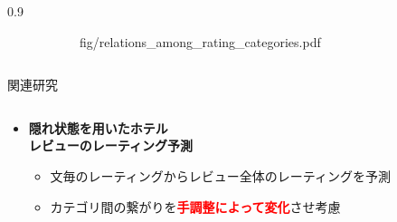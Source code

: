 \documentclass[unicode,10pt]{beamer}
\newlength{\mycolumnwidth}
\newcommand{\itemtitle}[1]{\textbf{#1}\\}
\newcommand{\fire}[1]{\textcolor{red}{\textbf{#1}}}
\begin{document}
\begin{frame}[t]
\begin{columns}[onlytextwidth,t]
\begin{column}{0.9\mycolumnwidth}
\begin{figure}
\begin{subfigure}[t]{0.475\linewidth}
                        {fig/relations_among_rating_categories.pdf}
      \end{subfigure}
      \hspace*{\fill} %
    \end{figure}
  \end{column}
\end{columns}

\begin{block}{関連研究}
  \begin{columns}[onlytextwidth,t]
    \begin{column}{0.3\textwidth}
      \begin{itemize}
        \item \itemtitle{隠れ状態を用いたホテル\\レビューのレーティング予測
                         \cite{fujitani15}}
          \begin{itemize}
            \item 文毎のレーティングからレビュー全体のレーティングを予測
            \item カテゴリ間の繋がりを\fire{手調整によって変化}させ考慮
          \end{itemize}
      \end{itemize}
    \end{column}


\end{columns}
\end{block}
\end{frame}
\end{document}
